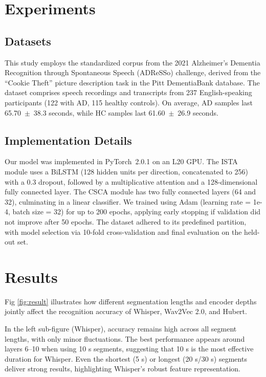 \documentclass[journal]{IEEEtran}
\begin{document}
\section{Experiments}
\label{sec:experiments}
\subsection{Datasets}
This study employs the standardized corpus from the 2021 Alzheimer’s Dementia Recognition through Spontaneous Speech (ADReSSo) challenge, derived from the “Cookie Theft” picture description task in the Pitt DementiaBank database. 
The dataset comprises speech recordings and transcripts from 237 English-speaking participants (122 with AD, 115 healthy controls). 
On average, AD samples last 65.70~$\pm$~38.3 seconds, while HC samples last 61.60~$\pm$~26.9 seconds. 








\subsection{Implementation Details}
Our model was implemented in PyTorch~2.0.1 on an L20 GPU. The ISTA module uses a BiLSTM (128 hidden units per direction, concatenated to 256) with a 0.3 dropout, followed by a multiplicative attention and a 128-dimensional fully connected layer. The CSCA module has two fully connected layers (64 and 32), culminating in a linear classifier. We trained using Adam (learning rate = 1e-4, batch size = 32) for up to 200 epochs, applying early stopping if validation did not improve after 50 epochs. The dataset adhered to its predefined partition, with model selection via 10-fold cross-validation and final evaluation on the held-out set.




\section{Results}
Fig \ref{fig:result} illustrates how different segmentation lengths and encoder depths jointly affect the recognition accuracy of Whisper, Wav2Vec 2.0, and Hubert.

In the left sub-figure (Whisper), accuracy remains high across all segment lengths, with only minor fluctuations. The best performance appears around layers 6–10 when using 10 s segments, suggesting that 10 s is the most effective duration for Whisper. Even the shortest (5 s) or longest (20 s/30 s) segments deliver strong results, highlighting Whisper’s robust feature representation.
\end{document}
